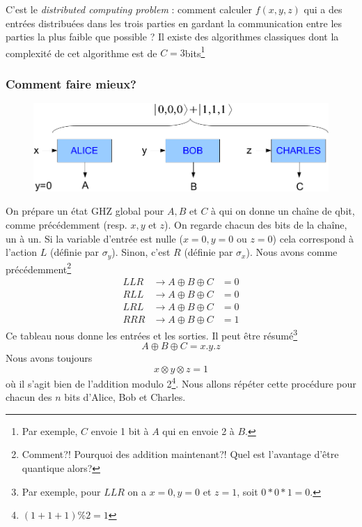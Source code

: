 C'est le \textit{distributed computing problem} : comment calculer $f(x,y,z)$ qui a des entrées
distribuées dans les trois parties en gardant la communication entre les parties la plus faible
que possible ? Il existe des algorithmes classiques dont la complexité de cet algorithme est 
de $C=3$bits\footnote{Par exemple, $C$ envoie 1 bit à $A$ qui en envoie 2 à $B$.}


\subsubsection{Comment faire mieux?}
	\begin{figure}
	\vspace{-5mm}
	\includegraphics[scale=0.2]{ch2/image3.png}
	\end{figure}
On prépare un état GHZ global pour $A,B$ et $C$ à qui on donne un chaîne de qbit, comme précédemment
(resp. $x,y$ et $z$). On regarde chacun des bits de la chaîne, un à un. Si la variable d'entrée est 
nulle ($x=0,y=0$ ou $z=0$) cela correspond à l'action $L$ (définie par $\sigma_y$). Sinon, c'est $R$
 (définie par $\sigma_x$). Nous avons comme précédemment\footnote{Comment?! Pourquoi des addition 
 maintenant?! Quel est l'avantage d'être quantique alors?}
\begin{equation}
\begin{array}{lll}
LLR&\to A\oplus B\oplus C &=0\\
RLL&\to A\oplus B\oplus C &=0\\
LRL&\to A\oplus B\oplus C &=0\\
RRR&\to A\oplus B\oplus C &=1
\end{array}
\end{equation}
Ce tableau nous donne les entrées et les sorties. Il peut être résumé\footnote{Par exemple, pour
$LLR$ on a $x=0,y=0$ et $z=1$, soit $0*0*1=0$.}
\begin{equation}
A\oplus B\oplus C = x.y.z
\end{equation}
Nous avons toujours
\begin{equation}
x\otimes y \otimes z = 1
\end{equation}
où il s'agit bien de l'addition modulo 2\footnote{$(1+1+1)\%2=1$}. Nous allons répéter cette 
procédure pour chacun des $n$ bits d'Alice, Bob et Charles.


